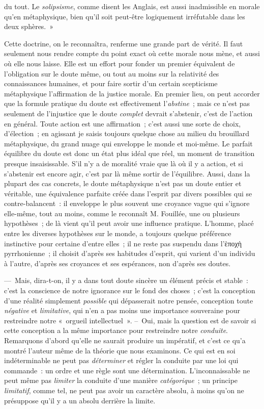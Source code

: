 \documentclass[french,twoside]{book} %
\begin{document}
du tout. Le \emph{solipsisme}, comme disent les Anglais, est aussi inadmissible en morale qu’en métaphysique, bien qu’il soit peut-être logiquement irréfutable dans les deux sphères. »\par
Cette doctrine, on le reconnaîtra, renferme une grande part de vérité. Il faut seulement nous rendre compte du point exact où cette morale nous mène, et aussi où elle nous laisse. Elle est un effort pour fonder un premier équivalent de l’obligation sur le doute même, ou tout au moins sur la relativité des connaissances humaines, et pour faire sortir d’un certain scepticisme métaphysique l’affirmation de la justice morale. En premier lieu, on peut accorder que la formule pratique du doute est effectivement l’\emph{abstine} ; mais ce n’est pas seulement de l’injustice que le doute \emph{complet} devrait s’abstenir, c’est de l’action en général. Toute action est une affirmation ; c’est aussi une sorte de choix, d’élection ; en agissant je saisis toujours quelque chose au milieu du brouillard métaphysique, du grand nuage qui enveloppe le monde et moi-même. Le parfait équilibre du doute est donc un état plus idéal que réel, un moment de transition presque insaisissable. S’il n’y a de moralité vraie que là où il y a action, et si s’abstenir est encore agir, c’est par là même sortir de l’équilibre. Aussi, dans la plupart des cas concrets, le doute métaphysique n’est pas un doute entier et véritable, une équivalence parfaite créée dans l’esprit par divers possibles qui se contre-balancent : il enveloppe le plus souvent une croyance vague qui s’ignore elle-même, tout au moins, comme le reconnaît M. Fouillée, une ou plusieurs hypothèses ; de là vient qu’il peut avoir une influence pratique. L’homme, placé entre les diverses hypothèses sur le monde, a toujours quelque préférence instinctive pour certaine d’entre elles ; il ne reste pas suspendu dans l’ὲποχὴ pyrrhonienne ; il choisit d’après ses habitudes d’esprit, qui varient d’un individu à l’autre, d’après ses croyances et ses espérances, non d’après ses doutes.\par
— Mais, dira-t-on, il y a dans tout doute sincère un élément précis et stable : c’est la conscience de notre ignorance sur le fond des choses ; c’est la conception d’une réalité simplement \emph{possible} qui dépasserait notre pensée, conception toute \emph{négative} et \emph{limitative}, qui n’en a pas moins une importance souveraine pour restreindre notre « orgueil intellectuel ». – Oui, mais la question est de savoir si cette conception a la même importance pour restreindre notre \emph{conduite}. Remarquons d’abord qu’elle ne saurait produire un impératif, et c’est ce qu’a montré l’auteur même de la théorie que nous examinons. Ce qui est en soi indéterminable ne peut pas \emph{déterminer} et régler la conduite par une loi qui commande : un ordre et une règle sont une détermination. L’inconnaissable ne peut même pas \emph{limiter} la conduite d’une manière \emph{catégorique} ; un principe \emph{limitatif}, comme tel, ne peut pas avoir un caractère absolu, à moins qu’on ne présuppose qu’il y a un absolu derrière la limite.\par
\end{document}
